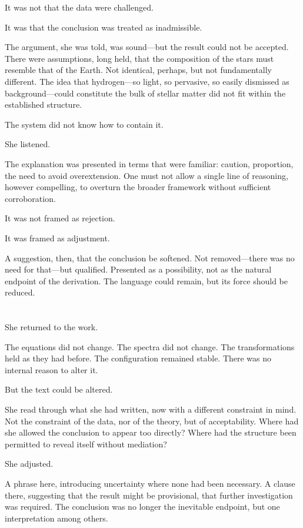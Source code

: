 It was not that the data were challenged.

It was that the conclusion was treated as inadmissible.

The argument, she was told, was sound---but the result could not
be accepted. There were assumptions, long held, that the
composition of the stars must resemble that of the Earth. Not
identical, perhaps, but not fundamentally different. The idea that
hydrogen---so light, so pervasive, so easily dismissed as
background---could constitute the bulk of stellar matter did not
fit within the established structure.

The system did not know how to contain it.

She listened.

The explanation was presented in terms that were familiar: caution,
proportion, the need to avoid overextension. One must not allow a
single line of reasoning, however compelling, to overturn the
broader framework without sufficient corroboration.

It was not framed as rejection.

It was framed as adjustment.

A suggestion, then, that the conclusion be softened. Not
removed---there was no need for that---but qualified. Presented as
a possibility, not as the natural endpoint of the derivation. The
language could remain, but its force should be reduced.

\section{}

She returned to the work.

The equations did not change. The spectra did not change. The
transformations held as they had before. The configuration remained
stable. There was no internal reason to alter it.

But the text could be altered.

She read through what she had written, now with a different
constraint in mind. Not the constraint of the data, nor of the
theory, but of acceptability. Where had she allowed the conclusion
to appear too directly? Where had the structure been permitted to
reveal itself without mediation?

She adjusted.

A phrase here, introducing uncertainty where none had been
necessary. A clause there, suggesting that the result might be
provisional, that further investigation was required. The conclusion
was no longer the inevitable endpoint, but one interpretation among
others.

